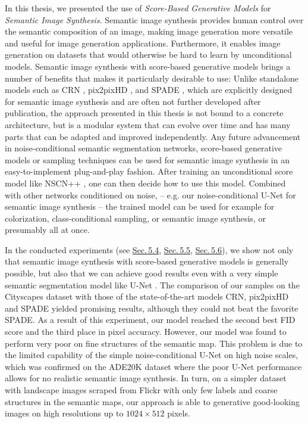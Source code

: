 In this thesis, we presented the use of \textit{Score-Based Generative Models} \cite{score_1, score_2, score_3} for \textit{Semantic Image Synthesis}. Semantic image synthesis provides human control over the semantic composition of an image, making image generation more versatile and useful for image generation applications. Furthermore, it enables image generation on datasets that would otherwise be hard to learn by unconditional models. Semantic image synthesis with score-based generative models brings a number of benefits that makes it particularly desirable to use: Unlike standalone models such as CRN \cite{crn}, pix2pixHD \cite{pix2pixHD}, and SPADE \cite{spade}, which are explicitly designed for semantic image synthesis and are often not further developed after publication, the approach presented in this thesis is not bound to a concrete architecture, but is a modular system that can evolve over time and has many parts that can be adapted and improved independently. Any future advancement in noise-conditional semantic segmentation networks, score-based generative models or sampling techniques can be used for semantic image synthesis in an easy-to-implement plug-and-play fashion. After training an unconditional score model like NSCN++ \cite{score_3}, one can then decide how to use this model. Combined with other networks conditioned on noise, – e.g. our noise-conditional U-Net for semantic image synthesis – the trained model can be used for example for colorization, class-conditional sampling, or semantic image synthesis, or presumably all at once.

In the conducted experiments (see \hyperref[sec:5.4]{Sec.\,5.4}, \hyperref[sec:5.5]{Sec.\,5.5}, \hyperref[sec:5.6]{Sec.\,5.6}), we show not only that semantic image synthesis with score-based generative models is generally possible, but also that we can achieve good results even with a very simple semantic segmentation model like U-Net \cite{unet}. The comparison of our samples on the Cityscapes dataset \cite{cityscapes} with those of the state-of-the-art models CRN, pix2pixHD and SPADE yielded promising results, although they could not beat the favorite SPADE. As a result of this experiment, our model reached the second best FID score \cite{fid} and the third place in pixel accuracy. However, our model was found to perform very poor on fine structures of the semantic map. This problem is due to the limited capability of the simple noise-conditional U-Net on high noise scales, which was confirmed on the ADE20K \cite{ade20k} dataset where the poor U-Net performance allows for no realistic semantic image synthesis. In turn, on a simpler dataset with landscape images scraped from Flickr with only few labels and coarse structures in the semantic maps, our approach is able to generative good-looking images on high resolutions up to $1024\times512$ pixels.


